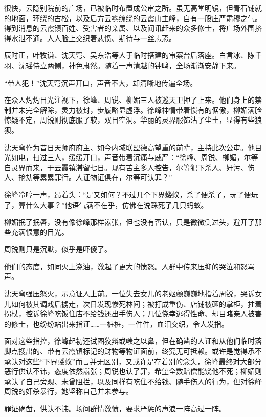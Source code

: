 \vspace{2em}

很快，云隐别院前的广场，已被临时布置成公审之所。虽无高堂明镜，但青石铺就的地面，环绕的古松，以及后方云雾缭绕的云霞山主峰，自有一股庄严肃穆之气。得到消息的云霞镇百姓、受害者的亲属、以及闻讯赶来的众多修士，将广场外围挤得水泄不通。人人脸上交织着悲愤、期待与一丝忐忑。

辰时正，叶牧谦、沈天穹、吴东浩等人于临时搭建的审案台后落座。白言冰、陈千羽、沈瑶侍立两侧，神色肃然。随着一声清越的钟鸣，全场渐渐安静下来。

“带人犯！”沈天穹沉声开口，声音不大，却清晰地传遍全场。

在众人灼灼目光注视下，徐峰、周锐、柳媚三人被巡天卫押了上来。他们身上的禁制并未完全解除，灵力被封，步履略显虚浮。徐峰神情带着惯有的倨傲，柳媚满脸惊疑不定，周锐则彻底服了软，双目空洞。华丽的灵界服饰沾了尘土，显得有些狼狈。

沈天穹作为昔日天师府府主、如今内域联盟德高望重的前辈，主持此次公审。他目光如电，扫过三人，缓缓开口，声音带着沉痛与威严：“徐峰、周锐、柳媚，尔等自灵界而来，于云霞镇滞留七日。现有苦主多人控告，尔等犯下杀人、奸污、伤人、抢劫等累累罪行。人证物证俱在，尔等可认罪？”

徐峰冷哼一声，昂着头：“是又如何？不过几个下界蝼蚁，杀了便杀了，玩了便玩了，算什么大事？”他语气满不在乎，仿佛在说踩死了几只蚂蚁。

柳媚抿了抿唇，没有像徐峰那样嚣张，但也没有否认，只是微微侧过头，避开了那些充满恨意的目光。

周锐则只是沉默，似乎是吓傻了。

他们的态度，如同火上浇油，激起了更大的愤怒。人群中传来压抑的哭泣和怒骂声。

沈天穹强压怒火，示意证人上前。一位失去女儿的老妪颤巍巍地指着周锐，哭诉女儿如何被其调戏后掳走，次日发现惨死林间；被打成重伤、店铺被砸的掌柜，拄着拐杖，控诉徐峰吃饭住店不给钱还出手伤人；几位侥幸逃得性命、却目睹亲人被害的修士，也纷纷站出来指证……一桩桩，一件件，血泪交织，令人发指。

面对这些指控，徐峰起初还试图狡辩或嗤之以鼻，但在确凿的人证和从他们临时落脚点搜出的、带有云霞镇标记的财物等物证面前，终究无可抵赖。或许是觉得承不承认对这些“下界蝼蚁”而言并无区别，又或许是存着别的念头，徐峰最终对大部分恶行供认不讳，态度依然嚣张；周锐也认了罪，希望全数赔偿能饶他不死；柳媚则承认了自己旁观、未曾阻拦，以及同样有吃住不给钱、随手伤人的行为，但对徐峰周锐的奸杀暴行，她坚称自己并未参与。

罪证确凿，供认不讳。场间群情激愤，要求严惩的声浪一阵高过一阵。

\vspace{2em}

